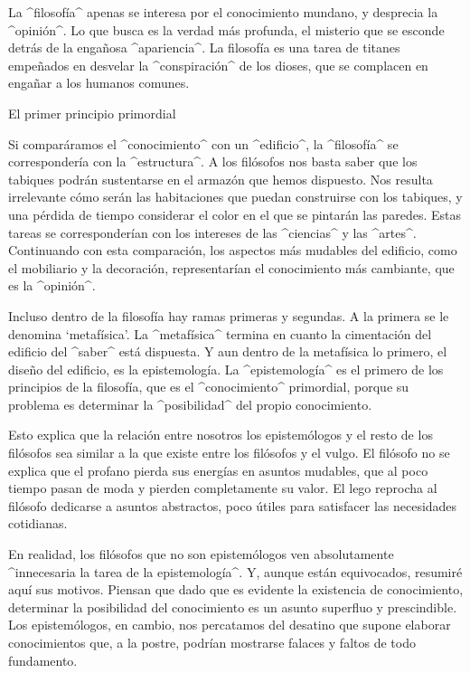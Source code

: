 La ^filosofía^ apenas se interesa por el conocimiento mundano, y
desprecia la ^opinión^. Lo que busca es la verdad más profunda, el
misterio que se esconde detrás de la engañosa ^apariencia^. La filosofía
es una tarea de titanes empeñados en desvelar la ^conspiración^ de los
dioses, que se complacen en engañar a los humanos comunes.


\Section El primer principio primordial

Si comparáramos el ^conocimiento^ con un ^edificio^, la ^filosofía^ se
correspondería con la ^estructura^. A los filósofos nos basta saber que
los tabiques podrán sustentarse en el armazón que hemos dispuesto. Nos
resulta irrelevante cómo serán las habitaciones que puedan construirse
con los tabiques, y una pérdida de tiempo considerar el color en el que
se pintarán las paredes. Estas tareas se corresponderían con los
intereses de las ^ciencias^ y las ^artes^. Continuando con esta
comparación, los aspectos más mudables del edificio, como el mobiliario
y la decoración, representarían el conocimiento más cambiante, que es la
^opinión^.

Incluso dentro de la filosofía hay ramas primeras y segundas. A la
primera se le denomina `metafísica'. La ^metafísica^ termina en cuanto
la cimentación del edificio del ^saber^ está dispuesta. Y aun dentro de
la metafísica lo primero, el diseño del edificio, es la epistemología.
La ^epistemología^ es el primero de los principios de la filosofía, que
es el ^conocimiento^ primordial, porque su problema es determinar la
^posibilidad^ del propio conocimiento.

Esto explica que la relación entre nosotros los epistemólogos y el resto
de los filósofos sea similar a la que existe entre los filósofos y el
vulgo. El filósofo no se explica que el profano pierda sus energías en
asuntos mudables, que al poco tiempo pasan de moda y pierden
completamente su valor. El lego reprocha al filósofo dedicarse a asuntos
abstractos, poco útiles para satisfacer las necesidades cotidianas.

En realidad, los filósofos que no son epistemólogos ven absolutamente
^innecesaria la tarea de la epistemología^. Y, aunque están equivocados,
resumiré aquí sus motivos. Piensan que dado que es evidente la
existencia de conocimiento, determinar la posibilidad del conocimiento
es un asunto superfluo y prescindible. Los epistemólogos, en cambio, nos
percatamos del desatino que supone elaborar conocimientos que, a la
postre, podrían mostrarse falaces y faltos de todo fundamento.


